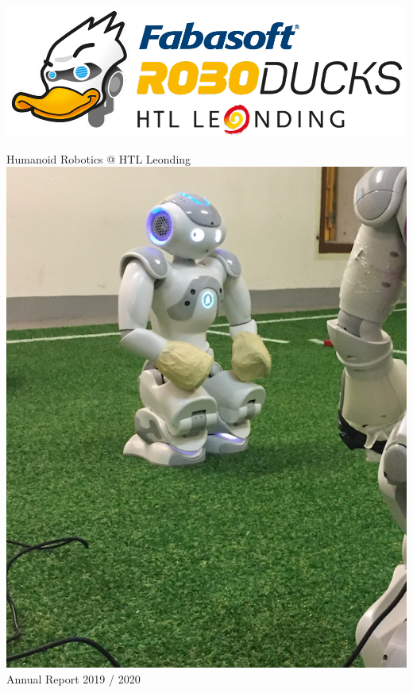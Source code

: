 \documentclass[11pt]{article}
\begin{document}
\begin{titlepage}
\begin{flushright}
\includegraphics[scale=.10]{img/DRAFT-RoboDucks-Logo.jpg}\\
\end{flushright}

\vspace{2em}

\begin{center}
{\Huge Humanoid Robotics @ HTL Leonding} \\[2em]
\includegraphics[scale=0.55]{img/Titlepage.png}\\[2em]
{\LARGE Annual Report 2019 / 2020}
\end{center}
\end{titlepage}
\end{document}
